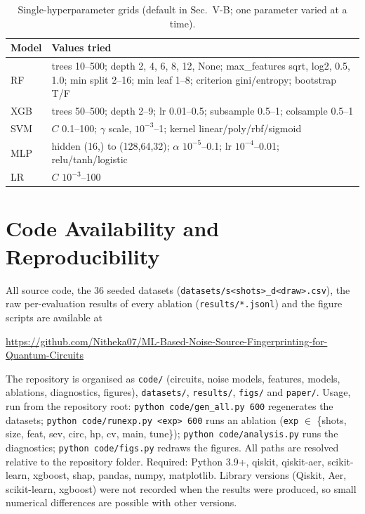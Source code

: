 \documentclass[conference]{IEEEtran}
\begin{document}
\begin{table}[!h]
\caption{Single-hyperparameter grids (default in Sec.~V-B; one parameter varied at a time).}
\label{tab:hpgrid}
\centering\scriptsize\setlength{\tabcolsep}{2pt}
\begin{tabular}{@{}lp{2.5in}@{}}
\toprule
Model & Values tried\\
\midrule
RF & trees 10--500; depth 2, 4, 6, 8, 12, None; max\_features sqrt, log2, 0.5, 1.0; min split 2--16; min leaf 1--8; criterion gini/entropy; bootstrap T/F\\
XGB & trees 50--500; depth 2--9; lr 0.01--0.5; subsample 0.5--1; colsample 0.5--1\\
SVM & $C$ 0.1--100; $\gamma$ scale, $10^{-3}$--1; kernel linear/poly/rbf/sigmoid\\
MLP & hidden (16,) to (128,64,32); $\alpha$ $10^{-5}$--0.1; lr $10^{-4}$--0.01; relu/tanh/logistic\\
LR & $C$ $10^{-3}$--100\\
\bottomrule
\end{tabular}
\end{table}

\section{Code Availability and Reproducibility}\label{app:code}
All source code, the 36 seeded datasets (\texttt{datasets/s<shots>\_d<draw>.csv}), the raw per-evaluation results of every ablation (\texttt{results/*.jsonl}) and the figure scripts are available at

\begin{center}\small\url{https://github.com/Nitheka07/ML-Based-Noise-Source-Fingerprinting-for-Quantum-Circuits}\end{center}

The repository is organised as \texttt{code/} (circuits, noise models, features, models, ablations, diagnostics, figures), \texttt{datasets/}, \texttt{results/}, \texttt{figs/} and \texttt{paper/}. Usage, run from the repository root: \texttt{python code/gen\_all.py 600} regenerates the datasets; \texttt{python code/runexp.py <exp> 600} runs an ablation (\texttt{exp} $\in$ \{shots, size, feat, sev, circ, hp, cv, main, tune\}); \texttt{python code/analysis.py} runs the diagnostics; \texttt{python code/figs.py} redraws the figures. All paths are resolved relative to the repository folder. Required: Python 3.9+, qiskit, qiskit-aer, scikit-learn, xgboost, shap, pandas, numpy, matplotlib. Library versions (Qiskit, Aer, scikit-learn, xgboost) were not recorded when the results were produced, so small numerical differences are possible with other versions.
\end{document}

